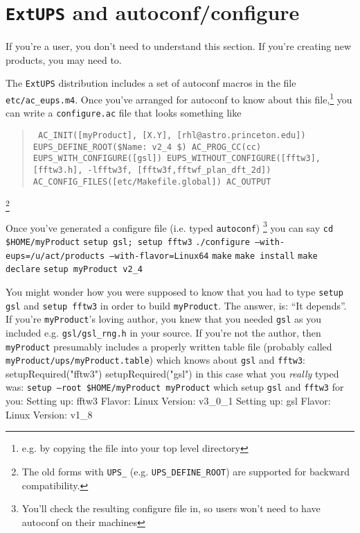 \documentclass{article}
\newcommand{\code}[1]{\texttt{#1}}
\newcommand{\file}[1]{\texttt{#1}}
\newcommand{\eups}{\code{ExtUPS}\xspace}
\let\overbatim=\verbatim
\let\oendverbatim=\endverbatim
\renewenvironment{verbatim}
{\center\minipage{16cm}\overbatim}
{\oendverbatim\endminipage\endcenter}
\begin{document}
\section{\eups and autoconf/configure}
\label{autoconf}

If you're a user, you don't need to understand this section. If
you're creating new products, you may need to.

The \eups distribution includes a set of autoconf macros
in the file \file{etc/ac\_eups.m4}. Once you've arranged for
autoconf to know about this file,\footnote{e.g. by copying the
  file into your top level directory} you can write a
\file{configure.ac} file that looks something like
\begin{quote}
\obeylines\tt\small\parskip=0pt
AC\_INIT([myProduct], [X.Y], [rhl@astro.princeton.edu])
EUPS\_DEFINE\_ROOT(\${Name}: v2\_4 \$)
AC\_PROG\_CC(cc)
EUPS\_WITH\_CONFIGURE([gsl])
EUPS\_WITHOUT\_CONFIGURE([fftw3], [fftw3.h], -lfftw3f, [fftw3f,fftwf\_plan\_dft\_2d])
AC\_CONFIG\_FILES([etc/Makefile.global])
AC\_OUTPUT
\end{quote}
\footnote{The old forms with \code{UPS\_} (e.g. \code{UPS\_DEFINE\_ROOT})
  are supported for backward compatibility.}

Once you've generated a configure file (i.e. typed \code{autoconf})%
\footnote{You'll check the resulting configure file in, so users won't
  need to have autoconf on their machines}
you can say\hfil\break
\code{cd \$HOME/myProduct}\hfil\break
\code{setup gsl; setup fftw3}\hfil\break
\code{./configure --with-eups=/u/act/products --with-flavor=Linux64}\hfil\break
\code{make}\hfil\break
\code{make install}\hfil\break
\code{make declare}\hfil\break
\code{setup myProduct v2\_4}\hfil\break

You might wonder how you were supposed to know that you had to type
\code{setup gsl} and \code{setup fftw3} in order to build
\code{myProduct}. The answer, is: ``It depends''.  If you're
\code{myProduct}'s loving author, you knew that you needed
\code{gsl} as you included e.g. \code{gsl/gsl\_rng.h} in your
source. If you're not the author, then \code{myProduct} presumably
includes a properly written table file (probably called
\code{myProduct/ups/myProduct.table}) which knows about
\code{gsl} and \code{fftw3}:
\begin{verbatim}
setupRequired("fftw3")
setupRequired("gsl")
\end{verbatim}
in this case what you \textit{really} typed was:\hfil\break
\code{setup --root \$HOME/myProduct myProduct}\hfil\break
which setup \code{gsl} and \code{fftw3} for you:
\begin{verbatim}
Setting up:      fftw3               Flavor: Linux      Version: v3_0_1
Setting up:      gsl                 Flavor: Linux      Version: v1_8
\end{verbatim}
\end{document}
